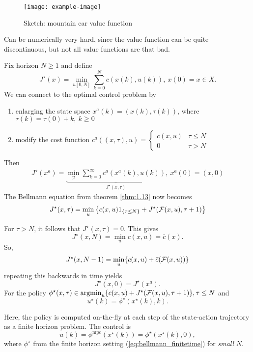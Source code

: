 \begin{figure}[H]\label{fig:1.07}
    \centering
    \texttt{[image: example-image]}
    \caption{Sketch: mountain car value function}
\end{figure}

Can be numerically very hard, since the value function can be quite discontinuous, but not all value functions are that bad.

 Fix horizon \(N\geq 1\) and define 
\[J^\star(x)=\min_{u[0,N]}\sum_{k=0}^N c(x(k),u(k)),\ x(0)=x\in X.\]
We can connect to the optimal control problem by 
\begin{enumerate}
    \item enlarging the state space \(x^a(k)=(x(k),\tau(k))\), where \(\tau(k)=\tau(0)+k,\ k\geq 0\)
    \item modify the cost function \(c^a((x,\tau),u)=\begin{cases}
        c(x,u) & \tau \leq N\\
        0 & \tau >N
    \end{cases}\)
\end{enumerate}
Then 
\begin{align*}
    J^\star(x^a)=\underbrace{\min_{\underbar{u}}\sum_{k=0}^\infty c^a(x^a(k),u(k))}_{J^\star(x,\tau)},\ x^a(0)=(x,0)
\end{align*}
The Bellmann equation from theorem \ref{thm:1.13} now becomes 
\begin{equation}\label{eq:bellmann_finitetime}
    J^\star(x,\tau)=\min_u\left\{c(x,u)1_{\{\tau \leq N\}}+J^\star(\mathcal{F}(x,u),\tau+1)\right\}
\end{equation}

For \(\tau>N\), it follows that \(J^\star(x,\tau)=0\).
This gives 
\[J^\star(x,N)=\min_{u}c(x,u)=\bar{c}(x).\]
So, \[J^\star(x,N-1)=\min_{u}\{c(x,u)+\bar{c}(\mathcal{F}(x,u))\}\]
repeating this backwards in time yields 
\[J^\star(x,0)=J^\star(x^a).\]
For the policy \(\phi^\star(x,\tau)\in \operatorname*{\text{argmin}}_{u}\{c(x,u)+J^\star(\mathcal{F}(x,u),\tau+1)\},\tau \leq N\)
and \[u^\star(k)=\phi^\star(x^\star(k),k).\]


Here, the policy is computed on-the-fly at 
each step of the state-action trajectory as a finite horizon 
problem. 
The control is 
\[u(k)=\phi^{\text{mpc}}(x^\star(k))=\phi^\star(x^\star(k),0),\]
where \(\phi^\star\) from the finite horizon setting (\ref{eq:bellmann_finitetime})
for \textit{small} \(N\).

